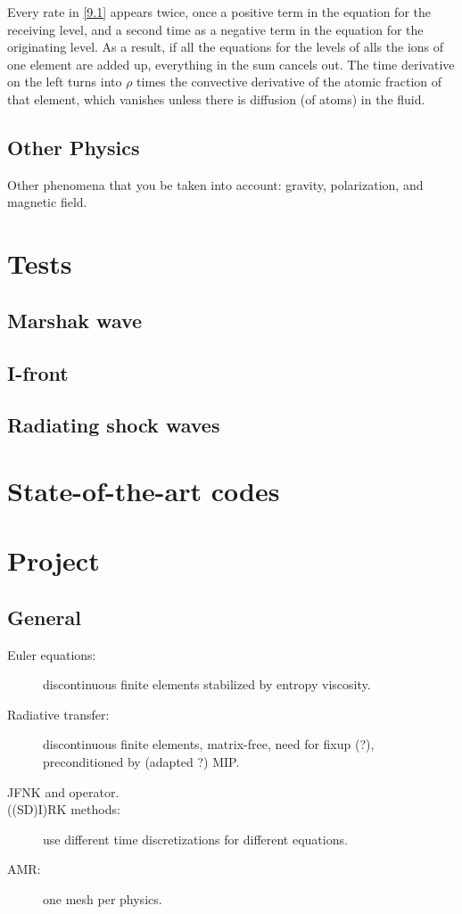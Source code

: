 \documentclass[letterpaper]{report}
\renewcommand{\(}{\left(}
\renewcommand{\)}{\right)}
\renewcommand{\[}{\left[}
\renewcommand{\]}{\right]}
\begin{document}
Every rate in \cref{9.1} appears twice, once a positive term in the equation
for the receiving level, and a second time as a negative term in the equation
for the originating level. As a result, if all the equations for the levels
of alls the ions of one element are added up, everything in the sum cancels
out. The time derivative on the left turns into $\rho$ times the convective
derivative of the atomic fraction of that element, which vanishes unless there
is diffusion (of atoms) in the fluid.

\section{Other Physics}
Other phenomena that you be taken into account: gravity, polarization, and
magnetic field.

\chapter{Tests}
\section{Marshak wave}
\section{I-front}
\section{Radiating shock waves}

\chapter{State-of-the-art codes}

\chapter{Project}

\section{General}
\begin{description}
  \item[Euler equations:] discontinuous finite elements stabilized by entropy
  viscosity.
  \item[Radiative transfer:] discontinuous finite elements, matrix-free,
  need for fixup (?), preconditioned by (adapted ?) MIP.
  \item[JFNK and operator.]
  \item[((SD)I)RK methods:] use different time discretizations for different
  equations.
  \item[AMR:] one mesh per physics.
\end{description}
\end{document}
